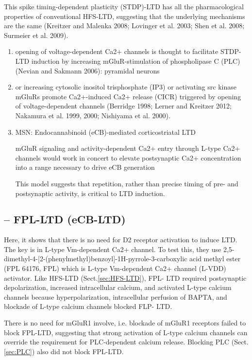 This spike timing-dependent plasticity (STDP)-LTD has all the pharmacological
properties of conventional HFS-LTD, suggesting that the underlying mechanisms
are the same (Kreitzer and Malenka 2008; Lovinger et al. 2003; Shen et al. 2008;
Surmeier et al. 2009).
\begin{enumerate}
  \item opening of voltage-dependent Ca2+
channels is thought to facilitate STDP-LTD induction by increasing
mGluR-stimulation of phospholipase C (PLC) (Nevian
and Sakmann 2006): pyramidal neurons

  \item or increasing cytosolic inositol trisphosphate (IP3) or activating
src kinase mGluRs promote Ca2+-induced Ca2+ release
(CICR) triggered by opening of voltage-dependent channels
(Berridge 1998; Lerner and Kreitzer 2012; Nakamura et al.
1999, 2000; Nishiyama et al. 2000).
  
  \item MSN: Endocannabinoid (eCB)-mediated corticostriatal LTD
   
  mGluR signaling and activity-dependent Ca2+ entry through L-type
Ca2+ channels would work in concert to elevate postsynaptic Ca2+ concentration
into a range necessary to drive eCB generation

This model suggests that repetition, rather than precise timing of pre- and
postsynaptic activity, is critical to LTD induction. \citep{plotkin2013}


\end{enumerate}

\subsection{-- FPL-LTD (eCB-LTD)}
\label{sec:FPL-LTD}

Here, it shows that there is no need for D2 receptor activation to induce LTD.
The key is in L-type Vm-dependent Ca2+ channel.
To test this, they use
2,5-dimethyl-4-[2-(phenylmethyl)benzoyl]-1H-pyrrole-3-carboxylic acid methyl
ester (FPL 64176, FPL) which is L-type Vm-dependent Ca2+ channel (L-VDD)
activator.
Like HFS-LTD (Sect.\ref{sec:HFS-LTD}), FPL- LTD required postsynaptic
depolarization, increased intracellular calcium, and activated L-type calcium
channels because  hyperpolarization,  intracellular perfusion of BAPTA, and
blockade of L-type calcium channels blocked FLP- LTD.

There is no need for mGluR1 involve, i.e. blockade of mGluR1 receptors failed to
block FPL-LTD, suggesting that strong activation of L-type calcium channels can
override the requirement for PLC-dependent calcium release.
Blocking PLC (Sect.\ref{sec:PLC}) also did not block FPL-LTD.


